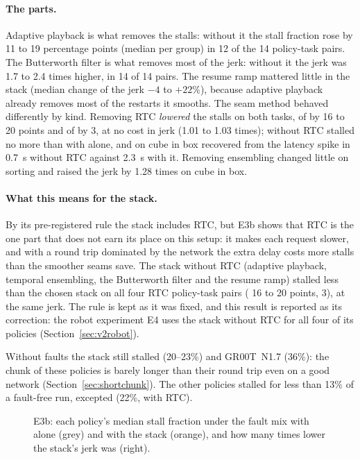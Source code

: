 \paragraph{The parts.} Adaptive playback is what removes the stalls: without it the stall fraction rose by 11 to 19
percentage points (median per group) in 12 of the 14 policy-task pairs. The Butterworth filter is what removes most of
the jerk: without it the jerk was 1.7 to 2.4 times higher, in 14 of 14 pairs. The resume ramp mattered little in the
stack (median change of the jerk $-4$ to $+22\%$), because adaptive playback already removes most of the restarts it
smooths. The seam method behaved differently by kind. Removing RTC \emph{lowered} the stalls on both tasks, of \smolvla{} by 16 to
20 points and of \groot{} by 3, at no cost in jerk (1.01 to 1.03 times); \smolvla{} without RTC stalled no more than with
\drtc{} alone, and on cube in box \groot{} recovered from the latency spike in 0.7~s without RTC against 2.3~s with it.
Removing ensembling changed little on sorting and raised the jerk by 1.28 times on cube in box.

\paragraph{What this means for the stack.} By its pre-registered rule the stack includes RTC, but E3b shows that RTC is
the one part that does not earn its place on this setup: it makes each request slower, and with a round trip
dominated by the network the extra delay costs more stalls than the smoother seams save. The stack without RTC
(adaptive playback, temporal ensembling, the Butterworth filter and the resume ramp) stalled less than the chosen stack on all four RTC
policy-task pairs (\smolvla{} 16 to 20 points, \groot{} 3), at the same jerk. The rule is kept as it was fixed, and this result is reported as its correction: the robot experiment E4 uses the
stack without RTC for all four of its policies (Section~\ref{sec:v2robot}).

Without faults the stack still stalled \groot{} (20--23\%) and GR00T~N1.7 (36\%): the chunk of these policies is barely
longer than their round trip even on a good network (Section~\ref{sec:shortchunk}). The other policies stalled for
less than 13\% of a fault-free run, \smolvla{} excepted (22\%, with RTC).

\begin{figure}[htbp]
  \centering
  \caption{E3b: each policy's median stall fraction under the fault mix with \drtc{} alone (grey) and with the stack
           (orange), and how many times lower the stack's jerk was (right).}
  \label{fig:v2stack}
\end{figure}

